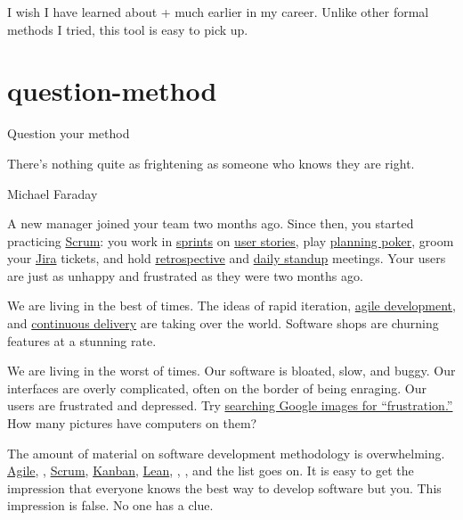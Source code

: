 \documentclass{article}
\begin{document}
I wish I have learned about + much earlier in my career.
Unlike other formal methods I tried, this tool is easy to pick up.

\section{question-method}{Question your method}
\epigraph{
  There's nothing quite as frightening as someone who knows they are right.
}{Michael Faraday}

A new manager joined your team two months ago.
Since then, you started practicing \href{https://www.scrum.org/}{Scrum}: you work in \href{https://www.scrum.org/resources/what-is-a-sprint-in-scrum}{sprints} on \href{https://www.atlassian.com/agile/project-management/user-stories}{user stories}, play \href{https://en.wikipedia.org/wiki/Planning_poker}{planning poker}, groom your \href{https://www.atlassian.com/software/jira}{Jira} tickets, and hold \href{https://www.scrum.org/resources/what-is-a-sprint-retrospective}{retrospective} and \href{https://www.agile-academy.com/en/scrum-master/daily-standup/}{daily standup} meetings.
Your users are just as unhappy and frustrated as they were two months ago.

We are living in the best of times.
The ideas of rapid iteration, \href{https://agilemanifesto.org/}{agile development}, and \href{https://continuousdelivery.com/}{continuous delivery} are taking over the world.
Software shops are churning features at a stunning rate.

We are living in the worst of times.
Our software is bloated, slow, and buggy.
Our interfaces are overly complicated, often on the border of being enraging.
Our users are frustrated and depressed.
Try \href{https://images.google.com/?q=frustration}{searching Google images for ``frustration.''}
How many pictures have computers on them?

The amount of material on software development methodology is overwhelming.
\href{https://agilemanifesto.org/}{Agile}, \href{https://en.wikipedia.org/wiki/Extreme_programming}{}, \href{https://scrum.org}{Scrum}, \href{https://en.wikipedia.org/wiki/Kanban_(development)}{Kanban}, \href{https://www.lean.org/}{Lean}, \href{https://en.wikipedia.org/wiki/Test-driven_development}{}, \href{https://en.wikipedia.org/wiki/Behavior-driven_development}{}, and the list goes on.
It is easy to get the impression that everyone knows the best way to develop software but you.
This impression is false.
No one has a clue.
\end{document}
